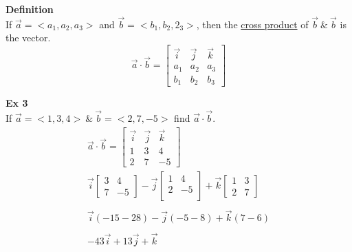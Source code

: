 \documentclass{article}
\begin{document}
  \textbf{Definition}\\
  If $ \vec{ a }  = < a_1, a_2, a_3> $ and $ \vec{ b } = < b_1, b_2, 2_3>   $, then the \underline{cross product} of $ \vec{ b } ~\&~ \vec{ b }   $ is the vector.
  \[
    \vec{a} \cdot \vec{ b } =
    \begin{bmatrix}
      \vec{ i } & \vec{ j } & \vec{ k }\\
      a_1 &a_2 &a_3\\
      b_1 &b_2 &b_3
    \end{bmatrix}
  \]
  
  \textbf{Ex 3}\\
  If $ \vec{ a } = < 1, 3, 4>   ~ \&~ \vec{ b } = < 2, 7, -5>  $ find $ \vec{ a } \cdot \vec{b }   $.
  \[
    \begin{gathered}
    \vec{ a } \cdot \vec{ b } =
    \begin{bmatrix}
      \vec{ i } & \vec{ j } & \vec{ k }  \\
      1 &3 &4\\
      2 &7 &-5
    \end{bmatrix}\\
    \vec{ i } 
    \begin{bmatrix}
      3 & 4\\
      7 &-5
    \end{bmatrix} -
    \vec{j} \begin{bmatrix}
      1 &4 \\
      2 &-5\\
    \end{bmatrix} +
    \vec{k} \begin{bmatrix}
      1 & 3\\
      2 & 7
    \end{bmatrix}\\
    ~\\
    \vec{i} (-15-28) - \vec{j}(-5-8) + \vec{k}(7-6)\\
    ~\\
    \boxed{-43\vec{i} + 13\vec{j} + \vec{k}} 
    \end{gathered}
  \]
\end{document}
